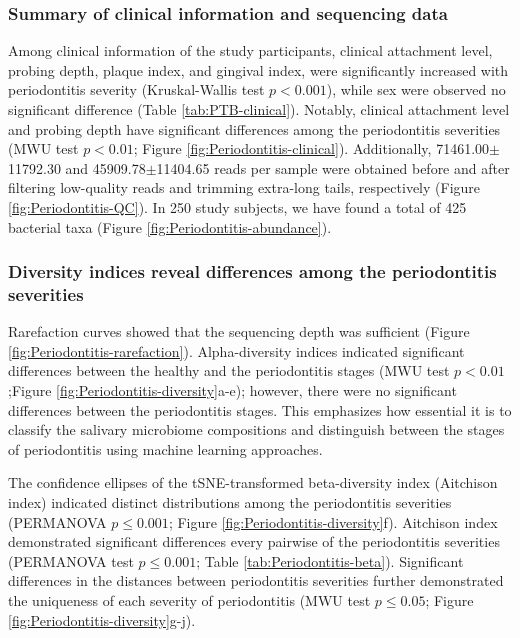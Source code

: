 \documentclass[11pt, a4paper, onecolumn, oneside]{report}
\begin{document}
            \subsubsection{Summary of  clinical information and sequencing data}
                Among clinical information of the study participants, clinical attachment level, probing depth, plaque index, and gingival index, were significantly increased with periodontitis severity (Kruskal-Wallis test $p < 0.001$), while sex were observed no significant difference (Table \ref{tab:PTB-clinical}). Notably, clinical attachment level and probing depth have significant differences among the periodontitis severities (MWU test $p < 0.01$; Figure \ref{fig:Periodontitis-clinical}). Additionally, 71461.00$\pm$11792.30 and 45909.78$\pm$11404.65 reads per sample were obtained before and after filtering low-quality reads and trimming extra-long tails, respectively (Figure \ref{fig:Periodontitis-QC}). In 250 study subjects, we have found a total of 425 bacterial taxa (Figure \ref{fig:Periodontitis-abundance}).

            \subsubsection{Diversity indices reveal differences among the periodontitis severities}
                Rarefaction curves showed that the sequencing depth was sufficient (Figure \ref{fig:Periodontitis-rarefaction}). Alpha-diversity indices indicated significant differences between the healthy and the periodontitis stages (MWU test $p < 0.01$;Figure \ref{fig:Periodontitis-diversity}a-e); however, there were no significant differences between the periodontitis stages. This emphasizes how essential it is to classify the salivary microbiome compositions and distinguish between the stages of periodontitis using machine learning approaches.

                The confidence ellipses of the tSNE-transformed beta-diversity index (Aitchison index) indicated distinct distributions among the periodontitis severities (PERMANOVA $p \le 0.001$; Figure \ref{fig:Periodontitis-diversity}f). Aitchison index demonstrated significant differences every pairwise of the periodontitis severities (PERMANOVA test $p \le 0.001$; Table \ref{tab:Periodontitis-beta}). Significant differences in the distances between periodontitis severities further demonstrated the uniqueness of each severity of periodontitis (MWU test $p \le 0.05$; Figure \ref{fig:Periodontitis-diversity}g-j).
\end{document}
